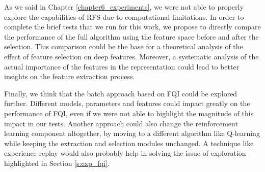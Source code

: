 As we said in Chapter \ref{chapter6_experiments}, we were not able to properly 
explore the capabilities of RFS due to computational limitations.
In order to complete the brief tests that we run for this work, we propose to
directly compare the performance of the full algorithm using the feature space
before and after the selection. 
This comparison could be the base for a theoretical analysis of the
effect of feature selection on deep features. Moreover, a systematic analysis
of the actual importance of the features in the representation could lead
to better insights on the feature extraction process. 

Finally, we think that the batch approach based on FQI could be explored further. 
Different models, parameters and features could impact greatly 
on the performance of FQI, even if we were not able to highlight the 
magnitude of this impact in our tests. 
Another approach could also change the reinforcement learning component 
altogether, by moving to a different algorithm like Q-learning while keeping
the extraction and selection modules unchanged. A technique like experience 
replay would also probably help in solving the issue of exploration highlighted 
in Section \ref{s:exp_fqi}.

